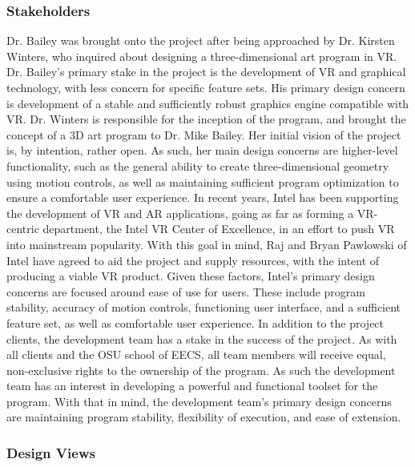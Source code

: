 \documentclass[onecolumn, draftclsnofoot,10pt, compsoc]{IEEEtran}
\newcounter{threesection}[subsubsection]
\begin{document}

{}

\subsubsection{Stakeholders}

Dr. Bailey was brought onto the project after being approached by Dr. Kirsten Winters, who inquired about designing a three-dimensional art program in VR.
Dr. Bailey’s primary stake in the project is the development of VR and graphical technology, with less concern for specific feature sets.
His primary design concern is development of a stable and sufficiently robust graphics engine compatible with VR.
Dr. Winters is responsible for the inception of the program, and brought the concept of a 3D art program to Dr. Mike Bailey.
Her initial vision of the project is, by intention, rather open.
As such, her main design concerns are higher-level functionality, such as the general ability to create three-dimensional geometry using motion controls, as well as maintaining sufficient program optimization to ensure a comfortable user experience.
In recent years, Intel has been supporting the development of VR and AR applications, going as far as forming a VR-centric department, the Intel VR Center of Excellence, in an effort to push VR into mainstream popularity.
With this goal in mind, Raj and Bryan Pawlowski of Intel have agreed to aid the project and supply resources, with the intent of producing a viable VR product.
Given these factors, Intel’s primary design concerns are focused around ease of use for users.
These include program stability, accuracy of motion controls, functioning user interface, and a sufficient feature set, as well as comfortable user experience. 
In addition to the project clients, the development team has a stake in the success of the project.
As with all clients and the OSU school of EECS, all team members will receive equal, non-exclusive rights to the ownership of the program.
As such the development team has an interest in developing a powerful and functional toolset for the program.
With that in mind, the development team’s primary design concerns are maintaining program stability, flexibility of execution, and ease of extension.

\subsubsection{Design Views}
\end{document}
